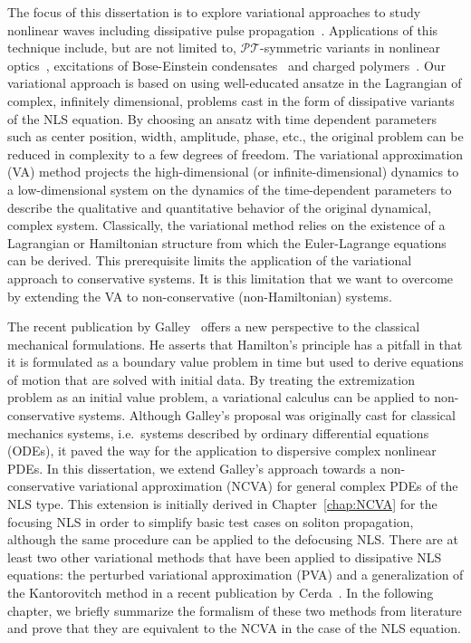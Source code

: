 The focus of this dissertation is to explore variational approaches to study nonlinear waves including dissipative pulse propagation~\cite{Cerda}.  Applications of this technique include, but are not limited to, $\mathcal{PT}$-symmetric variants in nonlinear optics~\cite{Kevrekidis2014}, excitations of Bose-Einstein condensates~\cite{Kreibich} and charged polymers~\cite{Jonsson}.  Our variational approach is based on using well-educated ansatze in the Lagrangian of complex, infinitely dimensional, problems cast in the form of dissipative variants of the NLS equation.  
By choosing an ansatz with time dependent parameters such as center position, width, amplitude, phase, etc., the original problem can be reduced in complexity to a few degrees of freedom.  The variational approximation (VA) method projects the high-dimensional (or infinite-dimensional) dynamics to a low-dimensional system on the dynamics of the time-dependent parameters to describe the qualitative and quantitative behavior of the original dynamical, complex system.  %
Classically, the variational method relies on the existence of a Lagrangian or Hamiltonian structure from which the Euler-Lagrange equations can be derived.  This prerequisite limits the application of the variational approach to conservative systems.  It is this limitation that we want to overcome by extending the VA to non-conservative (non-Hamiltonian) systems. 

The recent publication by Galley~\cite{Galley} offers a new perspective to the classical mechanical formulations.  He asserts that  Hamilton's principle has a pitfall in that it is formulated as a boundary value problem in time but used to derive equations of motion that are solved with initial data.  By treating the extremization problem as an initial value problem, a variational calculus can be applied to non-conservative systems.  Although Galley's proposal was originally cast for classical mechanics systems, i.e.~systems described by ordinary differential equations (ODEs), it paved the way for the application to dispersive complex nonlinear PDEs.  In this dissertation, we extend Galley's approach towards a non-conservative variational approximation (NCVA) for general complex PDEs of the NLS type.  This extension is initially derived in Chapter~\ref{chap:NCVA} for the focusing NLS in order to simplify basic test cases on soliton propagation, although the same procedure can be applied to the defocusing NLS.  There are at least two other variational methods that have been applied to dissipative NLS equations: the perturbed variational approximation (PVA) and a generalization of the Kantorovitch method in a recent publication by Cerda~\cite{Cerda}.  In the following chapter, we briefly summarize the formalism of these two methods from literature and prove that they are equivalent to the NCVA in the case of the NLS equation.  

